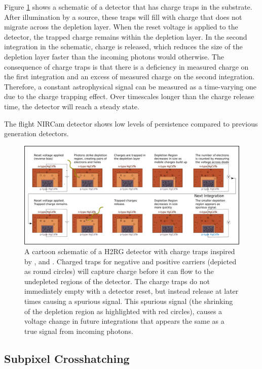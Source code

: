 \documentclass{aastex62}
\begin{document}
Figure \ref{fig:npSchematicTraps} shows a schematic of a detector that has charge traps in the substrate.
After illumination by a source, these traps will fill with charge that does not migrate across the depletion layer.
When the reset voltage is applied to the detector, the trapped charge remains within the depletion layer.
In the second integration in the schematic, charge is released, which reduces the size of the depletion layer faster than the incoming photons would otherwise.
The consequence of charge traps is that there is a deficiency in measured charge on the first integration and an excess of measured charge on the second integration.
Therefore, a constant astrophysical signal can be measured as a time-varying one due to the charge trapping effect.
Over timescales longer than the charge release time, the detector will reach a steady state.

The flight NIRCam detector shows low levels of persistence compared to previous generation detectors.

\begin{figure}[!hbtp]
\centering
\includegraphics[width=.99\columnwidth]{charge_traps_photodiode.pdf}
\caption{A cartoon schematic of a H2RG detector with charge traps inspired by \citet{smith2008imgPersistence}, \citet{tulloch2018persistenceH2RG} and \citet{leisenring2016persistence}.
Charged traps for negative and positive carriers (depicted as round circles) will capture charge before it can flow to the undepleted regions of the detector.
The charge traps do not immediately empty with a detector reset, but instead release at later times causing a spurious signal.
This spurious signal (the shrinking of the depletion region as highlighted with red circles), causes a voltage change in future integrations that appears the same as a true signal from incoming photons.}\label{fig:npSchematicTraps}
\end{figure}

\subsection{Subpixel Crosshatching}
\end{document}

